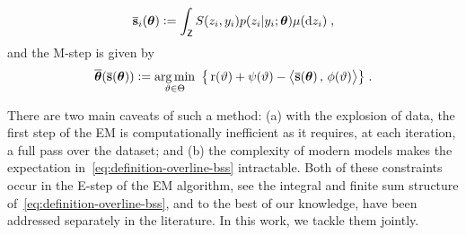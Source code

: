 \documentclass[12pt]{article}
\begin{document}
\begin{align}\label{eq:definition-overline-bss}
 \overline{{\mathbf{s}}}_i({\bm{\theta}}) \mathrel{\mathop:}= \int_{\mathsf{Z}} S(z_i,y_i) p(z_i|y_i;{\bm{\theta}}) \mu(\mathrm d z_i) \;,
\end{align}
and the {M-step} is given by
\begin{align}\label{eq:mstep}
\overline{{\bm{\theta}}}( \overline{{\mathbf{s}}}({\bm{\theta}}) ) \mathrel{\mathop:}= \mathop{\mathrm{arg\,min}}_{ \vartheta \in \Theta } ~\big\{ \operatorname{r}( \vartheta ) + \psi( \vartheta) - \big\langle \overline{{\mathbf{s}}}({\bm{\theta}})\, , \, \phi ( \vartheta)  \big\rangle \big\} \;.
\end{align}


There are two main caveats of such a method: {(a)} with the explosion of data, the first step of the EM is computationally inefficient as it requires, at each iteration, a full pass over the dataset; and {(b)} the complexity of modern  models makes the expectation in~\eqref{eq:definition-overline-bss} intractable. 
Both of these constraints occur in the E-step of the EM algorithm, see the integral and finite sum structure of~\eqref{eq:definition-overline-bss}, and to the best of our knowledge, have been addressed separately in the literature. 
In this work, we tackle them jointly.
\end{document}
